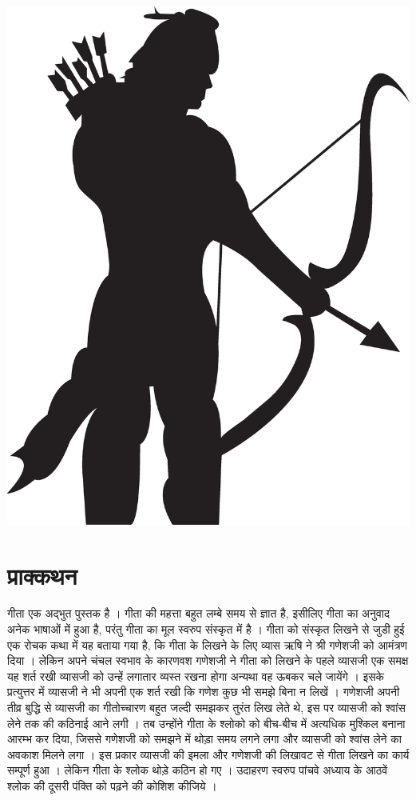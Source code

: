\chapter*{}
\begin{center}
	\includegraphics[scale=0.25,keepaspectratio]{eps2}
\end{center}
\chapter*{\sanskrit प्राक्कथन}
\sanskrit

गीता एक अद्भुत पुस्तक है ।  गीता की महत्ता बहुत लम्बे समय से ज्ञात है, इसीलिए गीता का अनुवाद अनेक भाषाओं में हुआ है, परंतु गीता का मूल स्वरुप संस्कृत में है ।  गीता को संस्कृत लिखने से जुडी हुई एक रोचक कथा में यह बताया गया है, कि गीता के लिखने के लिए व्यास ऋषि ने श्री गणेशजी को आमंत्रण दिया ।  लेकिन अपने चंचल स्वभाव के कारणवश गणेशजी ने गीता को लिखने के पहले व्यासजी एक समक्ष यह शर्त रखी व्यासजी को उन्हें लगातार व्यस्त रखना होगा अन्यथा वह ऊबकर चले जायेंगे ।  इसके प्रत्युत्तर में व्यासजी ने भी अपनी एक शर्त रखी कि गणेश कुछ भी समझे बिना न लिखें ।  गणेशजी अपनी तीव्र बुद्धि से व्यासजी का गीतोच्चारण बहुत जल्दी समझकर तुरंत लिख लेते थे, इस पर व्यासजी को श्वांस लेने तक की कठिनाई आने लगी ।  तब  उन्होंने गीता के श्लोको को बीच-बीच में अत्यधिक मुश्किल बनाना आरम्भ कर दिया, जिससे गणेशजी को समझने में थोड़ा समय लगने लगा और व्यासजी को श्वांस लेने का अवकाश मिलने लगा ।  इस प्रकार व्यासजी की इमला और गणेशजी की लिखावट से गीता लिखने का कार्य सम्पूर्ण हुआ ।  लेकिन गीता के श्लोक थोड़े कठिन हो गए ।  उदाहरण स्वरुप पांचवे अध्याय के आठवें श्लोक की दूसरी पंक्ति को पढ़ने की कोशिश कीजिये । 

